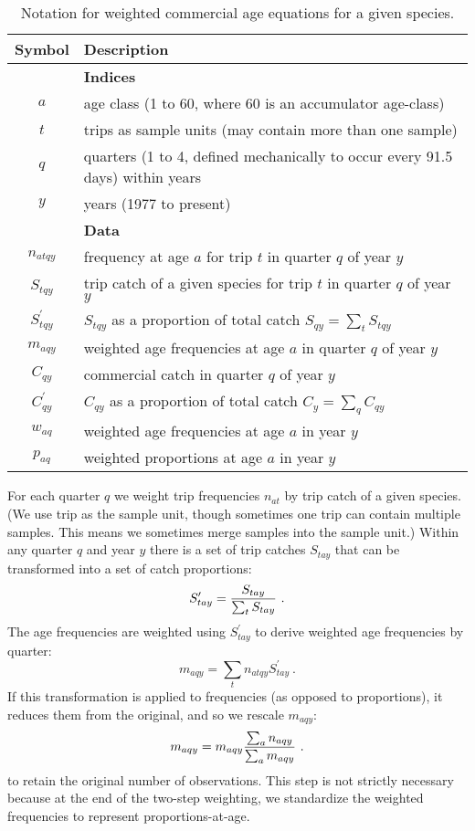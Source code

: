 \documentclass[letterpaper,12pt,fleqn]{article}
\def\tab{\hspace{0.5 in}}
\newcommand\tstrut{\rule{0pt}{2.4ex}}         %
\newcommand\bstrut{\rule[-1.0ex]{0pt}{0pt}}   %
\newcommand{\eqn}[1]{\begin{equation}#1\end{equation}}
\newcommand{\gfrac}[2]{\genfrac{}{}{}{0}{#1}{#2}}
\newcommand{\bold}[1]{{\bf #1}}
\begin{document}
\begin{table}[ht!]
  \vspace{6pt}\caption{Notation for weighted commercial age equations for a given species.}\vspace{-6pt}
  \begin{center}
    \begin{tabular}{cl}
    \hline
    Symbol & Description  \tstrut \bstrut \\
    \hline
              &  \bold{Indices}  \tstrut \\
    $a$       &  age class (1 to 60, where 60 is an accumulator age-class) \\
    $t$       &  trips as sample units (may contain more than one sample) \\
    $q$       &  quarters (1 to 4, defined mechanically to occur every 91.5 days) within years \\
    $y$       &  years (1977 to present) \\
              &  \bold{Data} \\
    $n_{atqy}$ & frequency at age $a$ for trip $t$ in quarter $q$ of year $y$ \\
    $S_{tqy}$  & trip catch of a given species for trip $t$ in quarter $q$ of year $y$ \\
    $S^\prime_{tqy}$  &  $S_{tqy}$ as a proportion of total catch $S_{qy} = \sum_{t} S_{tqy}$ \\
    $m_{aqy}$         &  weighted age frequencies at age $a$ in quarter $q$ of year $y$ \\
    $C_{qy}$          &  commercial catch in quarter $q$ of year $y$ \\
    $C_{qy}^\prime$   &  $C_{qy}$ as a proportion of total catch $C_y = \sum_{q} C_{qy}$ \\
    $w_{aq}$          & weighted age frequencies at age $a$ in year $y$ \\
    $p_{aq}$          & weighted proportions at age $a$ in year $y$  \bstrut \\
    \hline 
    \end{tabular}
  \end{center}
  \label{tab:PBStools-weightBio}
\end{table}

\tab For each quarter $q$ we weight trip frequencies $n_{at}$ by trip catch of a given species. (We use trip as the sample unit, though sometimes one trip can contain multiple samples. This means we sometimes merge samples into the sample unit.) Within any quarter $q$ and year $y$ there is a set of trip catches $S_{tay}$ that can be transformed into a set of catch proportions:
%
\eqn{S_{tay}^\prime = \gfrac{S_{tay}}{\sum_{t} S_{tay}}~.}
%
The age frequencies are weighted using $S_{tay}^\prime$ to derive weighted age frequencies by quarter:
%
\eqn{m_{aqy} = \sum_{t} n_{atqy} S_{tay}^\prime~.}
%
If this transformation is applied to frequencies (as opposed to proportions), it reduces them from the original, and so we rescale $m_{aqy}$:
%
\eqn{m_{aqy} = m_{aqy} \gfrac{\sum_{a} n_{aqy}}{\sum_{a} m_{aqy}}~.}
%
to retain the original number of observations. This step is not strictly necessary because at the end of the two-step weighting, we standardize the weighted frequencies to represent proportions-at-age.
\end{document}
